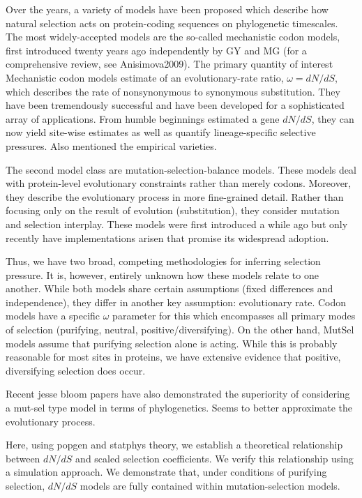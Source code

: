 \documentclass[11pt]{article}
\begin{document}
Over the years, a variety of models have been proposed which describe how natural selection acts on protein-coding sequences on phylogenetic timescales. The most widely-accepted models are the so-called mechanistic codon models, first introduced twenty years ago independently by GY and MG (for a comprehensive review, see Anisimova2009). The primary quantity of interest Mechanistic codon models estimate of an evolutionary-rate ratio, $\omega = dN/dS$, which describes the rate of nonsynonymous to synonymous substitution. They have been tremendously successful and have been developed for a sophisticated array of applications. From humble beginnings estimated a gene $dN/dS$, they can now yield site-wise estimates as well as quantify lineage-specific selective pressures. Also mentioned the empirical varieties.
	
The second model class are mutation-selection-balance models. These models deal with protein-level evolutionary constraints rather than merely codons. Moreover, they describe the evolutionary process in more fine-grained detail. Rather than focusing only on the result of evolution (substitution), they consider mutation and selection interplay. These models were first introduced a while ago but only recently have implementations arisen that promise its widespread adoption.

Thus, we have two broad, competing methodologies for inferring selection pressure. It is, however, entirely unknown how these models relate to one another. While both models share certain assumptions (fixed differences and independence), they differ in another key assumption: evolutionary rate. Codon models have a specific $\omega$ parameter for this which encompasses all primary modes of selection (purifying, neutral, positive/diversifying). On the other hand, MutSel models assume that purifying selection alone is acting. While this is probably reasonable for most sites in proteins, we have extensive evidence that positive, diversifying selection does occur. 

Recent jesse bloom papers have also demonstrated the superiority of considering a mut-sel type model in terms of phylogenetics. Seems to better approximate the evolutionary process.

Here, using popgen and statphys theory, we establish a theoretical relationship between $dN/dS$ and scaled selection coefficients. We verify this relationship using a simulation approach. We demonstrate that, under conditions of purifying selection, $dN/dS$ models are fully contained within mutation-selection models. 
\end{document}
